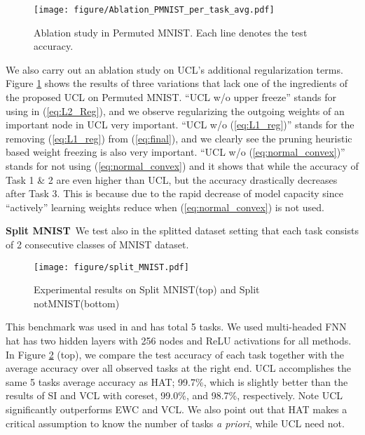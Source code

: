 \vspace{-.05in}
\begin{figure}[th]
    \centering
    \texttt{[image: figure/Ablation\_PMNIST\_per\_task\_avg.pdf]}
    \caption{Ablation study in Permuted MNIST. Each line denotes the test accuracy.}\label{fig:Ablation}\vspace{-.05in}
\end{figure}
We also carry out an ablation study on UCL's additional regularization terms. Figure \ref{fig:Ablation} shows the results of three variations that lack one of the ingredients of the proposed UCL on Permuted MNIST. 
``UCL w/o upper freeze'' stands for using  in (\ref{eq:L2_Reg}), and we observe regularizing the outgoing weights of an important node in UCL very important. 
``UCL w/o (\ref{eq:L1_reg})'' stands for the removing (\ref{eq:L1_reg}) from (\ref{eq:final}), and we clearly see the pruning heuristic based weight freezing is also very important. ``UCL w/o (\ref{eq:normal_convex})'' stands for not using (\ref{eq:normal_convex}) and it shows that while the accuracy of Task 1 \& 2 are even higher than UCL, but the accuracy drastically decreases after Task 3. 
This is because due to the rapid decrease of model capacity since ``actively'' learning weights reduce when (\ref{eq:normal_convex}) is not used. 














\textbf{Split MNIST}\ 
We test also in the splitted dataset setting that each task consists of 2 consecutive classes of MNIST dataset.
\begin{figure}[h]
    \centering
    \texttt{[image: figure/split\_MNIST.pdf]}
    \caption{Experimental results on Split MNIST(top) and Split notMNIST(bottom)}\vspace{-.05in}\label{fig:smnist_results}
\end{figure}This benchmark was used in \cite{(SI)ZenkePooleGang17, (VCL)NguLiBuiTurner18} and has total 5 tasks. 
We used multi-headed FNN hat has two hidden layers with 256 nodes and ReLU activations for all methods.
In Figure \ref{fig:smnist_results} (top), we compare the test accuracy of each task together with the average accuracy over all observed tasks at the right end. UCL accomplishes the same 5 tasks average accuracy as HAT; 99.7\%, which is slightly better than the results of SI and VCL with coreset, 99.0\%, and 98.7\%, respectively. Note UCL significantly outperforms EWC and VCL. We also point out that HAT makes a critical assumption to know the number of tasks \emph{a priori}, while UCL need not. 



